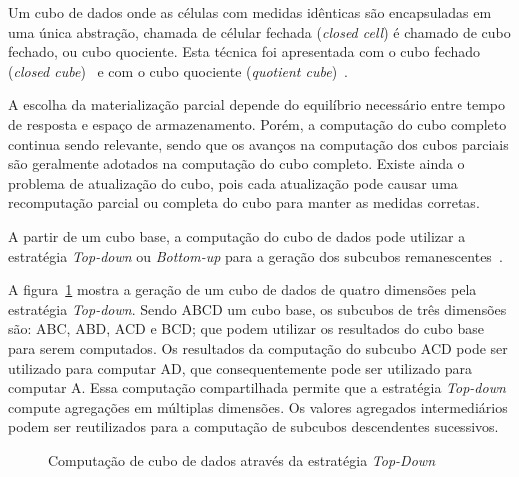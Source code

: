 Um cubo de dados onde as células com medidas idênticas são encapsuladas em uma única abstração, chamada de célular fechada (\textit{closed cell}) é chamado de cubo fechado, ou cubo quociente.
Esta técnica foi apresentada com o cubo fechado (\textit{closed cube})~\cite{dongxinCCubingEfficientComputation2006} e com o cubo quociente (\textit{quotient cube})~\cite{lakshmananQuotientCubeHow2002}.

A escolha da materialização parcial depende do equilíbrio necessário entre tempo de resposta e espaço de armazenamento.
Porém, a computação do cubo completo continua sendo relevante, sendo que os avanços na computação dos cubos parciais são geralmente adotados na computação do cubo completo.
Existe ainda o problema de atualização do cubo, pois cada atualização pode causar uma recomputação parcial ou completa do cubo para manter as medidas corretas.

A partir de um cubo base, a computação do cubo de dados pode utilizar a estratégia \textit{Top-down} ou \textit{Bottom-up} para a geração dos subcubos remanescentes~\cite{hanDataMiningConcepts2011}.

A figura~\ref{fig:topdown} mostra a geração de um cubo de dados de quatro dimensões pela estratégia \textit{Top-down}.
Sendo ABCD um cubo base, os subcubos de três dimensões são: ABC, ABD, ACD e BCD; que podem utilizar os resultados do cubo base para serem computados.
Os resultados da computação do subcubo ACD pode ser utilizado para computar AD, que consequentemente pode ser utilizado para computar A.
Essa computação compartilhada permite que a estratégia \textit{Top-down} compute agregações em múltiplas dimensões.
Os valores agregados intermediários podem ser reutilizados para a computação de subcubos descendentes sucessivos.

\begin{figure}[!htb]
	\caption{Computação de cubo de dados através da estratégia \textit{Top-Down}}\label{fig:topdown}
	\vspace{4mm}
	\begin{center}
	\end{center}
	\vspace{2mm}
	\legenda{}
\end{figure}

